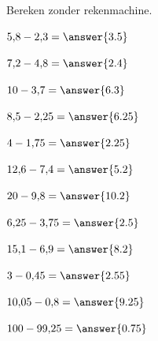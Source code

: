 \documentclass{ximera}
\begin{document}
\begin{oefening}{\oefB\ESS}

Bereken zonder rekenmachine.

\begin{question} \(5{,}8-2{,}3=\answer{3.5}\) \end{question}

\begin{question} \(7{,}2-4{,}8=\answer{2.4}\) \end{question}

\begin{question} \(10-3{,}7=\answer{6.3}\) \end{question}

\begin{question} \(8{,}5-2{,}25=\answer{6.25}\) \end{question}

\begin{question} \(4-1{,}75=\answer{2.25}\) \end{question}

\begin{question} \(12{,}6-7{,}4=\answer{5.2}\) \end{question}

\begin{question} \(20-9{,}8=\answer{10.2}\) \end{question}

\begin{question} \(6{,}25-3{,}75=\answer{2.5}\) \end{question}

\begin{question} \(15{,}1-6{,}9=\answer{8.2}\) \end{question}

\begin{question} \(3-0{,}45=\answer{2.55}\) \end{question}

\begin{question} \(10{,}05-0{,}8=\answer{9.25}\) \end{question}

\begin{question} \(100-99{,}25=\answer{0.75}\) \end{question}

\end{oefening}


\end{document}
